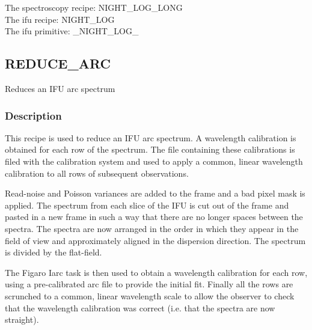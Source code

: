 \documentclass[twoside,11pt,nolof]{starlink}
\begin{document}
The spectroscopy recipe: NIGHT\_LOG\_LONG\\
The ifu recipe: NIGHT\_LOG\\
The ifu primitive: \_NIGHT\_LOG\_



\clearpage

\subsection{REDUCE\_ARC}



Reduces an IFU arc spectrum

\subsubsection*{Description}

This recipe is used to reduce an IFU arc spectrum. A wavelength
calibration is obtained for each row of the spectrum. The file
containing these calibrations is filed with the calibration system and
used to apply a common, linear wavelength calibration to all rows of
subsequent observations.



Read-noise and Poisson variances are added to the frame and a bad
pixel mask is applied. The spectrum from each slice of the IFU is cut
out of the frame and pasted in a new frame in such a way that there
are no longer spaces between the spectra. The spectra are now arranged
in the order in which they appear in the field of view and
approximately aligned in the dispersion direction. The spectrum is
divided by the flat-field.



The Figaro Iarc task is then used to obtain a wavelength calibration for
each row, using a pre-calibrated arc file to provide the initial
fit. Finally all the rows are scrunched to a common, linear wavelength
scale to allow the observer to check that the wavelength calibration
was correct (i.e. that the spectra are now straight).
\end{document}
